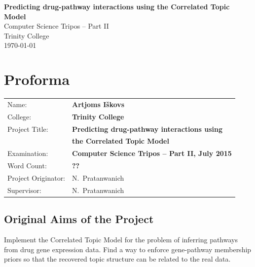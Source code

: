 \documentclass[12pt,a4paper,twoside,openright]{report}
\begin{document}





\pagestyle{empty}


\vspace*{60mm}
\begin{center}
\Huge
\textbf{Predicting drug-pathway interactions using the Correlated Topic Model} \\[5mm]
Computer Science Tripos -- Part II \\[5mm]
Trinity College \\[5mm]
\today  %
\end{center}


\pagestyle{plain}

\chapter*{Proforma}

{\large
\begin{tabular}{ll}
Name:               & \bf Artjoms I\v{s}kovs                       \\
College:            & \bf Trinity College                     \\
Project Title:     & \bf Predicting drug-pathway interactions using \\ & \bf the Correlated Topic Model\\
Examination:        & \bf Computer Science Tripos -- Part II, July 2015  \\
Word Count:         & \bf ??\\
Project Originator: & N.~Pratanwanich                    \\
Supervisor:         & N.~Pratanwanich                    \\ 
\end{tabular}
}

\section*{Original Aims of the Project}
Implement the Correlated Topic Model for the problem of inferring pathways from drug gene expression data. Find a way to enforce gene-pathway membership priors so that the recovered topic structure can be related to the real data.
\end{document}
